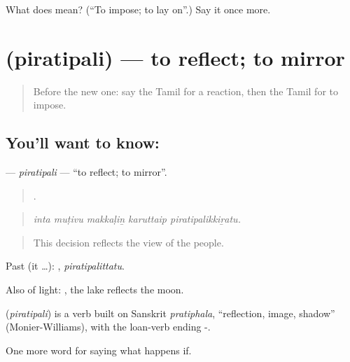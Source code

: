 \begin{tcolorbox}[breakable,colback=teal!4,colframe=teal!35!black,title={Before you move on}]
What does  mean? (\textquotedblleft{}To impose; to lay on\textquotedblright{}.) Say it once more.
\end{tcolorbox}
\section[\texorpdfstring{\ta{பிரதிபலி} (piratipali)}{பிரதிபலி (piratipali)}]{ (piratipali) — to reflect; to mirror}

\label{lesson:TA-C396-piratipali}



\begin{quote}
Before the new one: say the Tamil for a reaction, then the Tamil for to impose.
\end{quote}

\subsection*{You'll want to know: }
\textbf{} — \emph{piratipali} — \textquotedblleft{}to reflect; to mirror\textquotedblright{}.

\begin{quote}
    .
\end{quote}

\begin{quote}
\emph{inta muṭivu makkaḷiṉ karuttaip piratipalikkiṟatu.}
\end{quote}

\begin{quote}
This decision reflects the view of the people.
\end{quote}

Past (it …): , \emph{piratipalittatu}.

Also of light:   , the lake reflects the moon.

\begin{cousinweb}
\textbf{} (\emph{piratipali}) is a verb built on Sanskrit \emph{pratiphala}, \textquotedblleft{}reflection, image, shadow\textquotedblright{} (Monier-Williams), with the loan-verb ending -.
\end{cousinweb}

\begin{grammarlens}[title={What you've built}]
One more word for saying what happens if.
\end{grammarlens}

